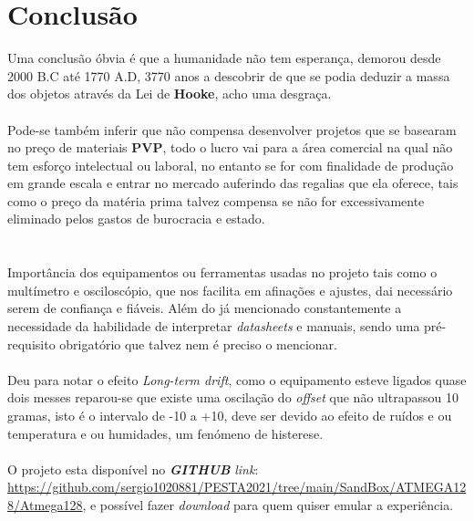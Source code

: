 \chapter{Conclusão}
Uma conclusão óbvia é que a humanidade não tem esperança, demorou desde 2000 B.C até 1770 A.D, 3770 anos a descobrir de que se podia deduzir a massa dos objetos através da Lei de \textbf{Hooke}, acho uma desgraça.
\\
\\
Pode-se também inferir que não compensa desenvolver projetos que se basearam no preço de materiais \textbf{PVP}, todo o lucro vai para a área comercial na qual não tem esforço intelectual ou laboral, no entanto se for com finalidade de produção em grande escala e entrar no mercado auferindo das regalias que ela oferece, tais como o preço da matéria prima talvez compensa se não for excessivamente eliminado pelos gastos de burocracia e estado. \\
\\
\\
Importância dos equipamentos ou ferramentas usadas no projeto tais como o multímetro e osciloscópio, que nos facilita em afinações e ajustes, dai necessário serem de confiança e fiáveis. Além do já mencionado constantemente a necessidade da habilidade de interpretar \textit{datasheets} e manuais, sendo uma pré-requisito obrigatório que talvez nem é preciso o mencionar.
\\
\\
Deu para notar o efeito \textit{Long-term drift}, como o equipamento esteve ligados quase dois messes reparou-se que existe uma oscilação do \textit{offset} que não ultrapassou 10 gramas, isto é o intervalo de -10 a +10, deve ser devido ao efeito de ruídos e ou temperatura e ou humidades, um fenómeno de histerese.
\\
\\
O projeto esta disponível no \textit{\textbf{GITHUB}} \textit{link}: \url{https://github.com/sergio1020881/PESTA2021/tree/main/SandBox/ATMEGA128/Atmega128}, e possível fazer \textit{download} para quem quiser emular a experiência.




\begin{comment}
Sensitivity,Long-Term Drift e Temperature Effects (Span temperature hysteresis).
\end{comment}
